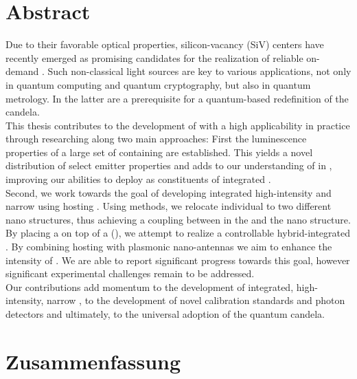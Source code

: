 \null\vfill


\section*{Abstract}

	Due to their favorable optical properties, silicon-vacancy (SiV) centers have recently emerged as promising candidates for the realization of reliable on-demand \spss. Such non-classical light sources are key to various applications, not only in quantum computing and quantum cryptography, but also in quantum metrology. In the latter \spss are a prerequisite for a quantum-based redefinition of the candela.
	\\
	This thesis contributes to the development of \spss with a high applicability in practice through researching \sivs along two main approaches: First the luminescence properties of a large set of \nds containing \sivs are established. This yields a novel distribution of select emitter properties and adds to our understanding of \sivs in \nds, improving our abilities to deploy \sivs as constituents of integrated \spss.
	\\
	Second, we work towards the goal of developing integrated high-intensity and narrow \lw \spss using \nds hosting \sivs. Using \pp methods, we relocate individual \nds to two different nano structures, thus achieving a coupling between \sivs in the \nd and the nano structure. By placing a \nd on top of a \vcsel (\VCSEL), we attempt to realize a controllable hybrid-integrated \sps. By combining \nds hosting \sivs with plasmonic nano-antennas we aim to enhance the \pl intensity of \sivs. We are able to report significant progress towards this goal, however significant experimental challenges remain to be addressed.
	\\
	Our contributions add momentum to the development of integrated, high-intensity, narrow \lw \spss, to the development of novel calibration standards and photon detectors and ultimately, to the universal adoption of the quantum candela.




\vfill

\newpage

\null\vfill

\section*{Zusammenfassung}

